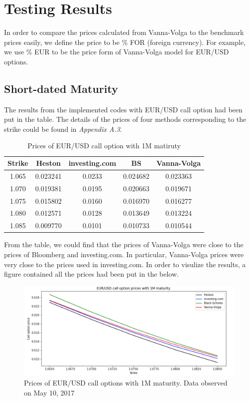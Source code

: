 \section{Testing Results}
In order to compare the prices calculated from Vanna-Volga to the benchmark prices easily, we define the price to be \% FOR (foreign currency). For example, we use \% EUR to be the price form of Vanna-Volga model for EUR/USD options.
\subsection{Short-dated Maturity}
The results from the implemented codes with EUR/USD call option had been put in the table. The details of the prices of four methods corresponding to the strike could be found in \textit{Appendix A.3}.

\begin{table}[htb]
\centering
\caption{Prices of EUR/USD call option with 1M matiruty}
\begin{tabular}{ccccc}
\hline \hline
Strike & Heston & investing.com & BS & Vanna-Volga \\ [0.5ex]
\hline
1.065 &	0.023241&	0.0233	&0.024682&	0.023363 \\ 
1.070&	0.019381&	0.0195&	0.020663&	0.019671\\
1.075	&0.015802&	0.0160&	0.016970&	0.016277 \\
1.080	&0.012571&	0.0128&	0.013649&	0.013224\\
1.085	&0.009770&	0.0101&	0.010733&	0.010544 \\ [0.5ex]
\hline
\end{tabular}
\label{table:prices-1M}
\end{table}

\noindent
From the table, we could find that the prices of Vanna-Volga were close to the prices of Bloomberg and investing.com. In particular, Vanna-Volga prices were very close to the prices used in investing.com. In order to visulize the results, a figure contained all the prices had been put in the below.

\begin{figure}[htb]
	\centering
\includegraphics[scale=0.4]{./Testing-data/Python-codes/Python-4prices-1M.png} 
\caption{Prices of EUR/USD call options with 1M maturity. Data observed on May 10, 2017}
\label{fig:prices-label} %
\end{figure}

